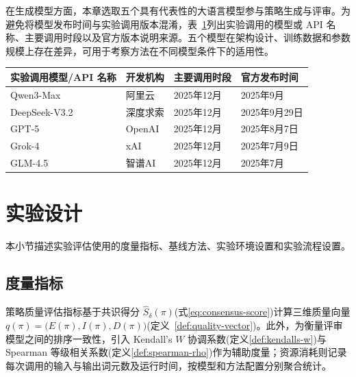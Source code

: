 在生成模型方面，本章选取五个具有代表性的大语言模型参与策略生成与评审。为避免将模型发布时间与实验调用版本混淆，表~\ref{tab:llm-models-info}列出实验调用的模型或 API 名称、主要调用时段以及官方版本说明来源。五个模型在架构设计、训练数据和参数规模上存在差异，可用于考察方法在不同模型条件下的适用性。
\begin{table}[htb]
	\centering{}
	\label{tab:llm-models-info}
	\renewcommand{\arraystretch}{1.05}
	\setlength{\tabcolsep}{4pt}
	\small
	\begin{tabularx}{0.88\linewidth}{>{\centering\arraybackslash}p{3.1cm} >{\centering\arraybackslash}p{2.0cm} >{\centering\arraybackslash}p{2.3cm} >{\centering\arraybackslash}X}
    \toprule
    \textbf{实验调用模型/API 名称} & \textbf{开发机构} & \textbf{主要调用时段} & \textbf{官方发布时间} \\
    \midrule
    Qwen3-Max & 阿里云 & 2025年12月 & 2025年9月\\
    \mbox{DeepSeek-V3.2} & 深度求索 & 2025年12月 & 2025年9月29日 \\
    GPT-5 & OpenAI & 2025年12月 & 2025年8月7日 \\
	Grok-4 & xAI & 2025年12月 & 2025年7月9日 \\
    GLM-4.5 & 智谱AI & 2025年12月 & 2025年7月 \\
    \bottomrule
    \end{tabularx}
\end{table}
\section{实验设计}
本小节描述实验评估使用的度量指标、基线方法、实验环境设置和实验流程设置。

\subsection{度量指标}

策略质量评估指标基于共识得分 $\hat{S}_\delta(\pi)$(式\eqref{eq:consensus-score})计算三维质量向量 $q(\pi)=\bigl(E(\pi),I(\pi),D(\pi)\bigr)$(定义~\ref{def:quality-vector})。此外，为衡量评审模型之间的排序一致性，引入 Kendall's $W$ 协调系数\cite{kendall1939problem}(定义\ref{def:kendalls-w})与 Spearman 等级相关系数\cite{spearman1961proof}(定义\ref{def:spearman-rho})作为辅助度量；资源消耗则记录每次调用的输入与输出词元数及运行时间，按模型和方法配置分别聚合统计。


